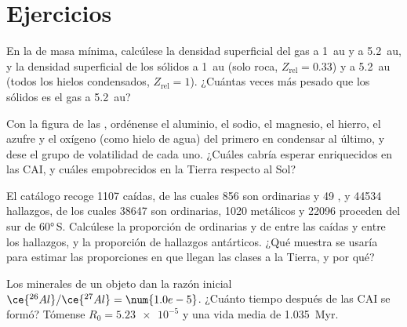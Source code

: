 \section{Ejercicios}

\begin{exercise}[$\star$]\label{exo:b2:planet-formation-meteorites:1}
En la  de masa mínima, calcúlese la densidad superficial del gas a
\qty{1}{au} y a \qty{5.2}{au}, y la densidad superficial de los sólidos a
\qty{1}{au} (solo roca, $Z_{\mathrm{rel}} = 0.33$) y a \qty{5.2}{au} (todos los hielos
condensados, $Z_{\mathrm{rel}} = 1$). ¿Cuántas veces más pesado que los sólidos es el
gas a \qty{5.2}{au}?
\end{exercise}

\begin{exercise}[$\star$]\label{exo:b2:planet-formation-meteorites:2}
Con la figura de las , ordénense el aluminio, el sodio,
el magnesio, el hierro, el azufre y el oxígeno (como hielo de agua) del primero en condensar al
último, y dese el grupo de volatilidad de cada uno. ¿Cuáles cabría esperar
enriquecidos en las CAI, y cuáles empobrecidos en la Tierra respecto al Sol?
\end{exercise}

\begin{exercise}[$\star$]\label{exo:b2:planet-formation-meteorites:3}
El catálogo recoge \num{1107} caídas, de las cuales 856 son  ordinarias y
49 , y \num{44534} hallazgos, de los cuales \num{38647} son  ordinarias,
\num{1020} metálicos y \num{22096} proceden del sur de \ang{60}\,S. Calcúlese la
proporción de  ordinarias y de  entre las caídas y entre los hallazgos,
y la proporción de hallazgos antárticos. ¿Qué muestra se usaría para estimar las
proporciones en que llegan las clases a la Tierra, y por qué?
\end{exercise}

\begin{exercise}[$\star$]\label{exo:b2:planet-formation-meteorites:4}
Los minerales de un objeto dan la razón inicial
$\ce{^{26}Al}/\ce{^{27}Al} = \num{1.0e-5}$. ¿Cuánto tiempo después de las CAI se formó?
Tómense $R_0 = \num{5.23e-5}$ y una vida media de \qty{1.035}{Myr}.
\end{exercise}

